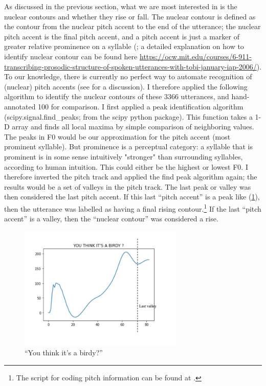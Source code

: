 As discussed in the previous section, what we are most interested in is the nuclear contours and whether they rise or fall. The nuclear contour is defined as the contour from the nuclear pitch accent to the end of the utterance; the nuclear pitch accent is the final pitch accent, and a pitch accent is just a marker of greater relative prominence on a syllable (\cite{buring2016intonation}; a detailed explanation on how to identify nuclear contour can be found here \url{https://ocw.mit.edu/courses/6-911-transcribing-prosodic-structure-of-spoken-utterances-with-tobi-january-iap-2006/}). To our knowledge, there is currently no perfect way to automate recognition of (nuclear) pitch accents (see \cite{buring2016intonation} for a discussion). I therefore applied the following algorithm to identify the nuclear contours of these 3366 utterances, and hand-annotated 100 for comparison. I first applied a peak identification algorithm (\textsf{scipy.signal.find\_peaks}; from the scipy python package). This function takes a 1-D array and finds all local maxima by simple comparison of neighboring values. The peaks in F0 would be our approximation for the pitch accent (most prominent syllable). But prominence is a perceptual category: a syllable that is prominent is in some sense intuitively "stronger" than surrounding syllables, according to human intuition. This could either be the highest or lowest F0. I therefore inverted the pitch track and applied the find peak algorithm again; the results would be a set of valleys in the pitch track. The last peak or valley was then considered the last pitch accent. If this last ``pitch accent'' is a peak like (\ref{fig:rise-example}), then the utterance was labelled as having a final rising contour.\footnote{The script for coding pitch information can be found at \mycode{}.} If the last ``pitch accent'' is a valley, then the ``nuclear contour'' was considered a rise. 

 
\begin{figure}[H]
    \centering
    \includegraphics[width=0.7\textwidth]{figures/pitch-rise.jpg}
    \caption{``You think it's a birdy?''}
    \label{fig:rise-example}
\end{figure}



